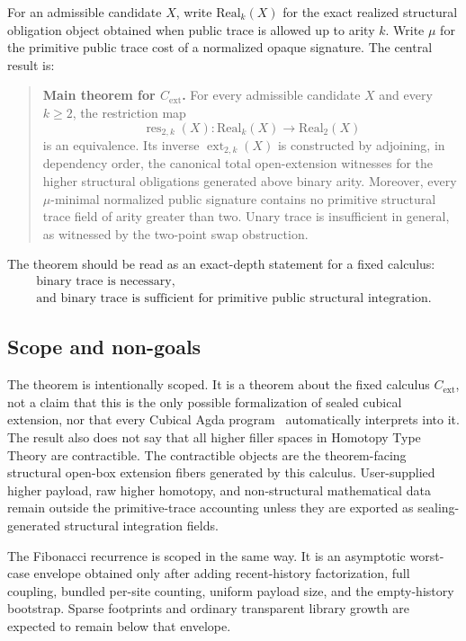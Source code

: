 \documentclass{lmcs}
\newcommand{\res}{\operatorname{res}}
\newcommand{\ext}{\operatorname{ext}}
\begin{document}
For an admissible candidate \(X\), write \(\mathrm{Real}_k(X)\) for the exact
realized structural obligation object obtained when public trace is allowed up
to arity \(k\).  Write \(\mu\) for the primitive public trace cost of a normalized
opaque signature.  The central result is:
\begin{quote}
\textbf{Main theorem for \(C_{\mathrm{ext}}\).}
For every admissible candidate \(X\) and every \(k\geq 2\), the restriction map
\[
  \res_{2,k}(X):\mathrm{Real}_k(X)\longrightarrow\mathrm{Real}_2(X)
\]
is an equivalence.  Its inverse \(\ext_{2,k}(X)\) is constructed by adjoining,
in dependency order, the canonical total open-extension witnesses for the
higher structural obligations generated above binary arity.
Moreover, every \(\mu\)-minimal normalized public signature contains no primitive
structural trace field of arity greater than two.  Unary trace is insufficient in
general, as witnessed by the two-point swap obstruction.
\end{quote}

The theorem should be read as an exact-depth statement for a fixed calculus:
\[
  \begin{gathered}
  \text{binary trace is necessary,}\\
  \text{and binary trace is sufficient for primitive public structural integration.}
  \end{gathered}
\]

\subsection{Scope and non-goals}
\label{subsec:scope-nongoals}

The theorem is intentionally scoped.  It is a theorem about the fixed calculus
\(C_{\mathrm{ext}}\), not a claim that this is the only possible formalization
of sealed cubical extension, nor that every Cubical Agda program~\cite{cubical-agda}
automatically interprets into it.  The result also does not say that all higher
filler spaces in Homotopy Type Theory are contractible.  The contractible
objects are the theorem-facing structural open-box extension fibers generated by
this calculus.  User-supplied higher payload, raw higher homotopy, and
non-structural mathematical data remain outside the primitive-trace accounting
unless they are exported as sealing-generated structural integration fields.

The Fibonacci recurrence is scoped in the same way.  It is an asymptotic
worst-case envelope obtained only after adding recent-history factorization,
full coupling, bundled per-site counting, uniform payload size, and the
empty-history bootstrap.  Sparse footprints and ordinary transparent library
growth are expected to remain below that envelope.
\end{document}
